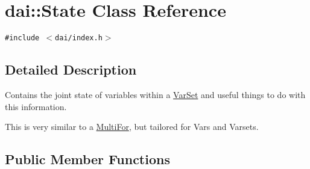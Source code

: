 \hypertarget{classdai_1_1State}{
\section{dai::State Class Reference}
\label{classdai_1_1State}
}
{\tt \#include $<$dai/index.h$>$}



\subsection{Detailed Description}
Contains the joint state of variables within a \hyperlink{classdai_1_1VarSet}{VarSet} and useful things to do with this information. 

This is very similar to a \hyperlink{classdai_1_1MultiFor}{MultiFor}, but tailored for Vars and Varsets. \subsection*{Public Member Functions}
